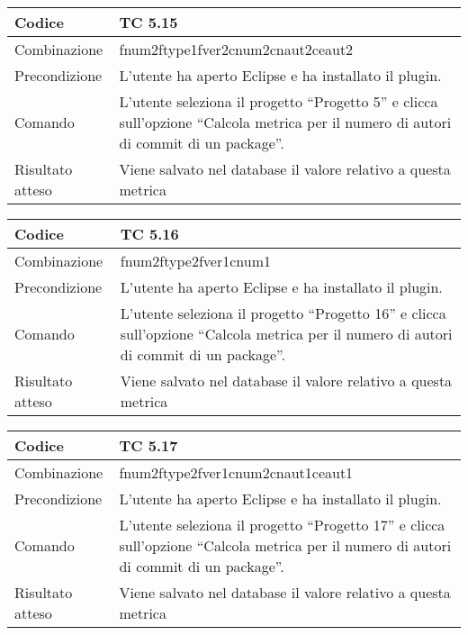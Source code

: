 \begin{table}[ht]
\begin{tabular}{|p{3cm}|p{9cm}|}
\hline
\cellcolor{lightgray}Codice				& TC 5.15								\\
\hline
\cellcolor{lightgray}Combinazione		& fnum2ftype1fver2cnum2cnaut2ceaut2 									\\
\hline
\cellcolor{lightgray}Precondizione		& L'utente ha aperto Eclipse e ha installato il plugin.			\\
\hline
\cellcolor{lightgray}Comando			& L'utente seleziona il progetto ``Progetto 5''  e clicca sull'opzione ``Calcola metrica per il numero di autori di commit di un package''.	\\
\hline
\cellcolor{lightgray}Risultato atteso	& Viene salvato nel database il valore relativo a questa metrica	\\
\hline
\end{tabular}
\end{table}



\begin{table}[ht]
\begin{tabular}{|p{3cm}|p{9cm}|}
\hline
\cellcolor{lightgray}Codice				& TC 5.16								\\
\hline
\cellcolor{lightgray}Combinazione		& fnum2ftype2fver1cnum1								\\
\hline
\cellcolor{lightgray}Precondizione		& L'utente ha aperto Eclipse e ha installato il plugin.				\\
\hline
\cellcolor{lightgray}Comando			& L'utente seleziona il progetto ``Progetto 16''  e clicca sull'opzione ``Calcola metrica per il numero di autori di commit di un package''.	\\
\hline
\cellcolor{lightgray}Risultato atteso	& Viene salvato nel database il valore relativo a questa metrica	\\
\hline
\end{tabular}
\end{table}

\clearpage

\begin{table}[ht]
\begin{tabular}{|p{3cm}|p{9cm}|}
\hline
\cellcolor{lightgray}Codice				& TC 5.17								\\
\hline
\cellcolor{lightgray}Combinazione		& fnum2ftype2fver1cnum2cnaut1ceaut1							\\
\hline
\cellcolor{lightgray}Precondizione		& L'utente ha aperto Eclipse e ha installato il plugin.									\\
\hline
\cellcolor{lightgray}Comando			& L'utente seleziona il progetto ``Progetto 17''  e clicca sull'opzione ``Calcola metrica per il numero di autori di commit di un package''.	\\
\hline
\cellcolor{lightgray}Risultato atteso	& Viene salvato nel database il valore relativo a questa metrica	\\
\hline
\end{tabular}
\end{table}

